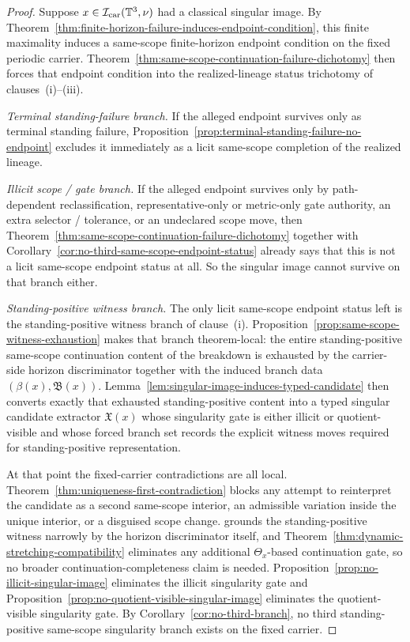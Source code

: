 \begin{proof}
Suppose $x\in\mathcal I_{\mathrm{car}}(\mathbb{T}^3,\nu)$ had a classical singular image. By Theorem~\ref{thm:finite-horizon-failure-induces-endpoint-condition}, this finite maximality induces a same-scope finite-horizon endpoint condition on the fixed periodic carrier. Theorem~\ref{thm:same-scope-continuation-failure-dichotomy} then forces that endpoint condition into the realized-lineage status trichotomy of clauses~(i)--(iii).

\smallskip
\noindent\textit{Terminal standing-failure branch.} If the alleged endpoint survives only as terminal standing failure, Proposition~\ref{prop:terminal-standing-failure-no-endpoint} excludes it immediately as a licit same-scope completion of the realized lineage.

\smallskip
\noindent\textit{Illicit scope / gate branch.} If the alleged endpoint survives only by path-dependent reclassification, representative-only or metric-only gate authority, an extra selector / tolerance, or an undeclared scope move, then Theorem~\ref{thm:same-scope-continuation-failure-dichotomy} together with Corollary~\ref{cor:no-third-same-scope-endpoint-status} already says that this is not a licit same-scope endpoint status at all. So the singular image cannot survive on that branch either.

\smallskip
\noindent\textit{Standing-positive witness branch.} The only licit same-scope endpoint status left is the standing-positive witness branch of clause~(i). Proposition~\ref{prop:same-scope-witness-exhaustion} makes that branch theorem-local: the entire standing-positive same-scope continuation content of the breakdown is exhausted by the carrier-side horizon discriminator together with the induced branch data $(\beta(x),\mathfrak B(x))$. Lemma~\ref{lem:singular-image-induces-typed-candidate} then converts exactly that exhausted standing-positive content into a typed singular candidate extractor $\mathfrak X(x)$ whose singularity gate is either illicit or quotient-visible and whose forced branch set records the explicit witness moves required for standing-positive representation.

At that point the fixed-carrier contradictions are all local. Theorem~\ref{thm:uniqueness-first-contradiction} blocks any attempt to reinterpret the candidate as a second same-scope interior, an admissible variation inside the unique interior, or a disguised scope change. \HorizonDetectabilityRef{} grounds the standing-positive witness narrowly by the horizon discriminator itself, and Theorem~\ref{thm:dynamic-stretching-compatibility} eliminates any additional $\Theta_x$-based continuation gate, so no broader continuation-completeness claim is needed. Proposition~\ref{prop:no-illicit-singular-image} eliminates the illicit singularity gate and Proposition~\ref{prop:no-quotient-visible-singular-image} eliminates the quotient-visible singularity gate. By Corollary~\ref{cor:no-third-branch}, no third standing-positive same-scope singularity branch exists on the fixed carrier.


\end{proof}

